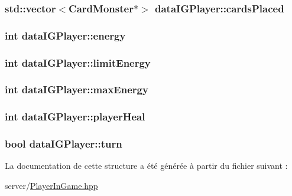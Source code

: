 \subsubsection[{cards\+Placed}]{\setlength{\rightskip}{0pt plus 5cm}std\+::vector$<${\bf Card\+Monster}$\ast$$>$ data\+I\+G\+Player\+::cards\+Placed}\label{structdataIGPlayer_a32709b71453d54100f95fae5535c0cb5}
\hypertarget{structdataIGPlayer_a62d62c03941a981f96ae02098ae8d2e2}{}
\subsubsection[{energy}]{\setlength{\rightskip}{0pt plus 5cm}int data\+I\+G\+Player\+::energy}\label{structdataIGPlayer_a62d62c03941a981f96ae02098ae8d2e2}
\hypertarget{structdataIGPlayer_ae0958559747cb2ebad4e6c7ba6095c3f}{}
\subsubsection[{limit\+Energy}]{\setlength{\rightskip}{0pt plus 5cm}int data\+I\+G\+Player\+::limit\+Energy}\label{structdataIGPlayer_ae0958559747cb2ebad4e6c7ba6095c3f}
\hypertarget{structdataIGPlayer_a27dcb13892444b5fcfebe7d01d05141a}{}
\subsubsection[{max\+Energy}]{\setlength{\rightskip}{0pt plus 5cm}int data\+I\+G\+Player\+::max\+Energy}\label{structdataIGPlayer_a27dcb13892444b5fcfebe7d01d05141a}
\hypertarget{structdataIGPlayer_addf0349de6577e21e1697b0853f37afb}{}
\subsubsection[{player\+Heal}]{\setlength{\rightskip}{0pt plus 5cm}int data\+I\+G\+Player\+::player\+Heal}\label{structdataIGPlayer_addf0349de6577e21e1697b0853f37afb}
\hypertarget{structdataIGPlayer_a42cbe10f46e1e6bbd514e624cf6e1526}{}
\subsubsection[{turn}]{\setlength{\rightskip}{0pt plus 5cm}bool data\+I\+G\+Player\+::turn}\label{structdataIGPlayer_a42cbe10f46e1e6bbd514e624cf6e1526}


La documentation de cette structure a été générée à partir du fichier suivant \+:\begin{DoxyCompactItemize}
\item 
server/\hyperlink{PlayerInGame_8hpp}{Player\+In\+Game.\+hpp}\end{DoxyCompactItemize}
